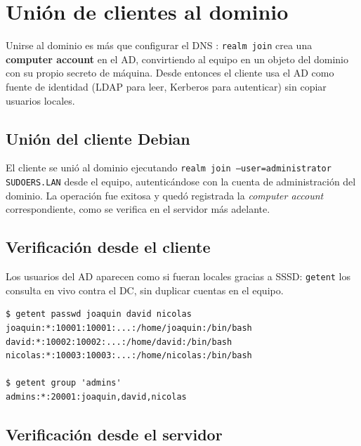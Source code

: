 \section{Unión de clientes al dominio}

Unirse al dominio es más que configurar el DNS \citep{msft_activedirectory}:
\texttt{realm join} crea una \textbf{computer account} en el AD, convirtiendo
al equipo en un objeto del dominio con su propio secreto de máquina. Desde
entonces el cliente usa el AD como fuente de identidad (LDAP para leer,
Kerberos para autenticar) sin copiar usuarios locales.

\subsection{Unión del cliente Debian}

El cliente se unió al dominio ejecutando \texttt{realm join --user=administrator
SUDOERS.LAN} desde el equipo, autenticándose con la cuenta de administración
del dominio. La operación fue exitosa y quedó registrada la \emph{computer
account} correspondiente, como se verifica en el servidor más adelante.

\subsection{Verificación desde el cliente}

Los usuarios del AD aparecen como si fueran locales gracias a SSSD:
\texttt{getent} los consulta en vivo contra el DC, sin duplicar cuentas en el
equipo.

\begin{lstlisting}[style=terminal]
$ getent passwd joaquin david nicolas
joaquin:*:10001:10001:...:/home/joaquin:/bin/bash
david:*:10002:10002:...:/home/david:/bin/bash
nicolas:*:10003:10003:...:/home/nicolas:/bin/bash

$ getent group 'admins'
admins:*:20001:joaquin,david,nicolas
\end{lstlisting}


\subsection{Verificación desde el servidor}

